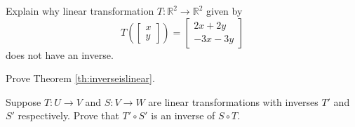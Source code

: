 \documentclass{ximera}
\newcommand{\RR}{\mathbb{R}}
\begin{document}
\begin{problem}Explain why linear transformation $T:\RR^2\rightarrow\RR^2$ given by $$T\left(\begin{bmatrix}x\\y\end{bmatrix}\right)=\begin{bmatrix}2x+2y\\-3x-3y\end{bmatrix}$$ does not have an inverse.
\end{problem}
\begin{problem}\label{prob:inverseislinear}
Prove Theorem \ref{th:inverseislinear}.  
\end{problem}
\begin{problem} Suppose $T:U\rightarrow V$ and $S:V\rightarrow W$ are linear transformations with inverses $T'$ and $S'$ respectively.  Prove that $T'\circ S'$ is an inverse of $S\circ T$.
\end{problem}
\end{document}
